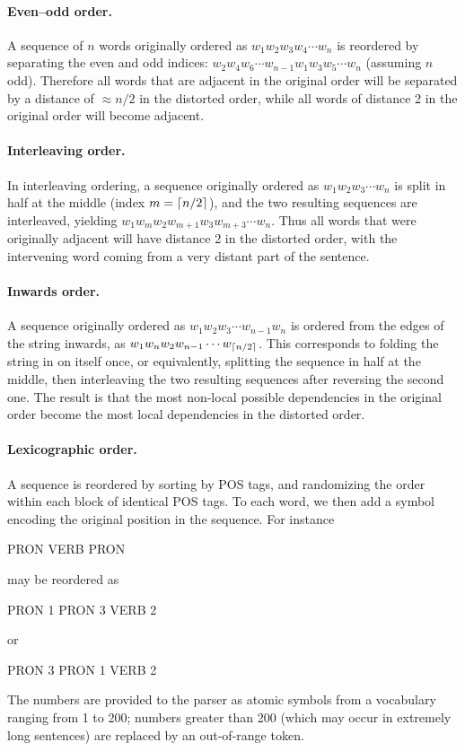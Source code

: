 \documentclass[10pt,twoside,lineno]{article}
\DeclarePairedDelimiter{\ceiling}{\lceil}{\rceil}
\begin{document}
\paragraph{Even--odd order.} A sequence of $n$ words originally ordered as $w_1 w_2 w_3 w_4 \cdots w_n$ is reordered by separating the even and odd indices: $w_2 w_4 w_6 \cdots w_{n-1} w_1 w_3 w_5 \cdots w_n$ (assuming $n$ odd). Therefore all words that are adjacent in the original order will be separated by a distance of $\approx n/2$ in the distorted order, while all words of distance 2 in the original order will become adjacent.

\paragraph{Interleaving order.} In interleaving ordering, a sequence originally ordered as $w_1 w_2 w_3 \cdots w_n$ is split in half at the middle (index $m=\ceiling{n/2}$), and the two resulting sequences are interleaved, yielding $w_1 w_m w_2 w_{m+1} w_3 w_{m+3} \cdots w_n$. Thus all words that were originally adjacent will have distance 2 in the distorted order, with the intervening word coming from a very distant part of the sentence.

\paragraph{Inwards order.} A sequence originally ordered as $w_1 w_2 w_3 \cdots w_{n-1} w_n$ is ordered from the edges of the string inwards, as $w_1 w_n w_2 w_{n-1} \cdots w_{\ceiling{n/2}}$. This corresponds to folding the string in on itself once, or equivalently, splitting the sequence in half at the middle, then interleaving the two resulting sequences after reversing the second one. The result is that the most non-local possible dependencies in the original order become the most local dependencies in the distorted order.

\paragraph{Lexicographic order.} A sequence is reordered by sorting by POS tags, and randomizing the order within each block of identical POS tags.
To each word, we then add a symbol encoding the original position in the sequence.
For instance
\begin{center}
PRON VERB PRON
\end{center}
may be reordered as
\begin{center}
PRON 1 PRON 3 VERB 2
\end{center}
or
\begin{center}
PRON 3 PRON 1 VERB 2
\end{center}
The numbers are provided to the parser as atomic symbols from a vocabulary ranging from 1 to 200; numbers greater than 200 (which may occur in extremely long sentences) are replaced by an out-of-range token.
\end{document}
